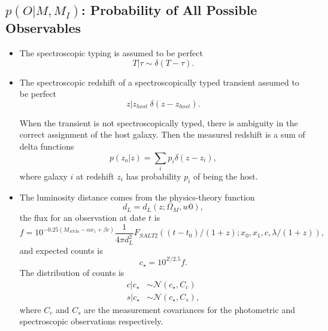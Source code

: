 \documentclass[preprint,3p]{elsarticle}
\begin{document}
\subsection{$p(O| M, M_I)$: Probability of All Possible Observables}
\begin{itemize}
\item The spectroscopic typing is assumed to be perfect
\begin{equation}
T | \tau \sim \delta (T-\tau).
\end{equation}

\item The spectroscopic redshift of a spectroscopically typed transient assumed to be perfect
\begin{equation}
z | z_{host} ~ \delta (z-z_{host}).
\end{equation}

When the transient is not spectroscopically typed, there is ambiguity in the correct assignment of the host galaxy.
Then the measured redshift is a sum of delta functions
\begin{equation}
p(z_o|z) = \sum_i p_i \delta(z-z_i),
\end{equation}
where galaxy $i$ at
redshift $z_i$ has probability $p_i$ of being
the host.  

\item  The luminosity distance comes from the physics-theory function
\begin{equation}
d_L = d_L(z; \Omega_M, w0),
\end{equation}
the flux for an observation at date $t$ is
\begin{equation}
f = 10^{-0.25 \left(M_{SNIa} - \alpha x_1 + \beta c \right)}\frac{1}{4\pi d_L^2} F_{SALT2}((t-t_0)/(1+z); x_0,  x_1, c, \lambda/(1+z)),
\end{equation}
and expected counts is
\begin{equation}
c_\star = 10^{Z/2.5}f.
\end{equation}
The distribution of counts is 
\begin{align*}
c | c_\star &\sim \mathcal{N}(c_\star, C_c)\\
s | c_\star &\sim \mathcal{N}(c_\star, C_s),
\end{align*}
where $C_c$ and $C_s$ are the measurement covariances for the photometric and spectroscopic observations respectively.

\end{itemize}
\end{document}
